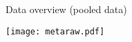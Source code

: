 
\begin{frame}{Data overview (pooled data)}
	\begin{flushright}
		\texttt{[image: metaraw.pdf]}
	\end{flushright}
\end{frame}

